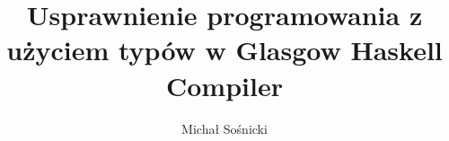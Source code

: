 \documentclass[a4paper,12pt,twoside]{book}
\author{Michał Sośnicki}
\title{Usprawnienie programowania z użyciem typów w Glasgow Haskell Compiler}
\begin{document}
\frontmatter

\tableofcontents

\mainmatter
\pagestyle{headings}









\appendix
\renewcommand{\chaptermark}[1]{%
\markboth{\MakeUppercase{%
DODATEK \thechapter.%
\ }}{}}

\end{document}
